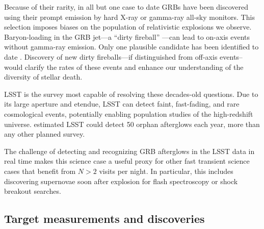 Because of their rarity, in all but one case \citep{2015ApJ...803L..24C}
to date GRBs have been discovered using their prompt emission by hard
X-ray or gamma-ray all-sky monitors. This selection imposes biases on
the population of relativistic explosions we observe. Baryon-loading in
the GRB jet---a ``dirty fireball'' \citep{2003ApJ...591.1097R}---can
lead to on-axis events without gamma-ray emission.  Only one plausible
candidate has been identified to date \citep{2013ApJ...769..130C}.
Discovery of new dirty fireballs---if distinguished from off-axis
events--would clarify the rates of these events and enhance our
understanding of the diversity of stellar death.

LSST is the survey most capable of resolving these decades-old
questions.  Due to its large aperture and etendue, LSST can detect
faint, fast-fading, and rare cosmological events, potentially enabling
population studies of the high-redshift universe.
\citet{2015A&A...578A..71G} estimated LSST could detect 50 orphan
afterglows each year, more than any other planned survey.




The challenge of detecting and recognizing GRB afterglows in the LSST data in
real time makes this science case a useful proxy for other fast transient
science cases that benefit from $N > 2$ visits per night.  In particular, this
includes discovering supernovae soon after explosion for flash spectroscopy or
shock breakout searches.



\subsection{Target measurements and discoveries}
\label{sec:\secname:targets}


